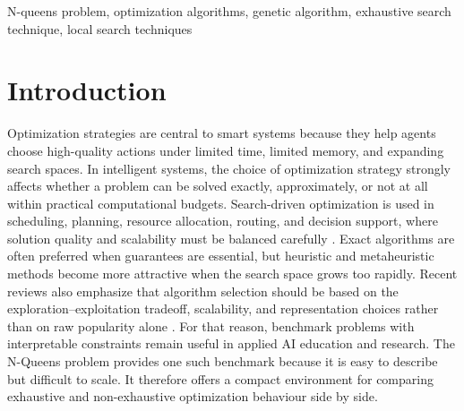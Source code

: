 \documentclass[conference]{IEEEtran}
\begin{document}
\begin{IEEEkeywords}
N-queens problem, optimization algorithms, genetic algorithm, exhaustive search technique, local search techniques
\end{IEEEkeywords}


\section{Introduction}
Optimization strategies are central to smart systems because they help agents choose high-quality actions under limited time, limited memory, and expanding search spaces. In intelligent systems, the choice of optimization strategy strongly affects whether a problem can be solved exactly, approximately, or not at all within practical computational budgets. Search-driven optimization is used in scheduling, planning, resource allocation, routing, and decision support, where solution quality and scalability must be balanced carefully \cite{russell2021aima,benaissa2024metaheuristic,houssein2024metaheuristics}. Exact algorithms are often preferred when guarantees are essential, but heuristic and metaheuristic methods become more attractive when the search space grows too rapidly. Recent reviews also emphasize that algorithm selection should be based on the exploration--exploitation tradeoff, scalability, and representation choices rather than on raw popularity alone \cite{rashed2024advancements,ruiztorrubiano2025mdp}. For that reason, benchmark problems with interpretable constraints remain useful in applied AI education and research. The N-Queens problem provides one such benchmark because it is easy to describe but difficult to scale. It therefore offers a compact environment for comparing exhaustive and non-exhaustive optimization behaviour side by side.
\end{document}
